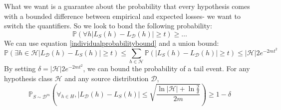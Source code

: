 \documentclass{article}
\newcommand{\p}{\mathbb{P}}
\newcommand{\D}{\mathcal{D}}
\newcommand{\h}{\mathcal{H}}
\begin{document}
  What we want is a guarantee about the probability that every hypothesis comes with a bounded difference between empirical and expected losses- we want to switch the quantifiers. So we look to bond the following probability:
  $$\p\left( \forall h |L_S(h) - L_\D(h)| \geq t \right) \geq \hdots $$
  We can use equation \eqref{individualprobabilitybound} and a union bound:
  $$\p\left( \exists h \in \h |L_\D(h) - L_S(h)| \geq t \right) \leq
  \sum_{h \in \h} \p\left( | L_S(h) - L_\D(h)| \geq t \right)
  \leq |\h | 2 e^{-2mt^2} $$
  By setting $\delta = |\h | 2 e^{-2mt^2}$, we can bound the probability of
  a tail event. For any hypothesis class $\h$ and any source distribution
   $\D$,
  \begin{equation}\label{thrm}
     \p_{S \sim \D^m} \left( \forall_{h \in H}, |L_\D(h) - L_S(h)|
    \leq \sqrt{\frac{\ln |\h| + \ln \frac{2}{\delta}}{2m}} \right) \geq
    1 - \delta
  \end{equation}
\end{document}
